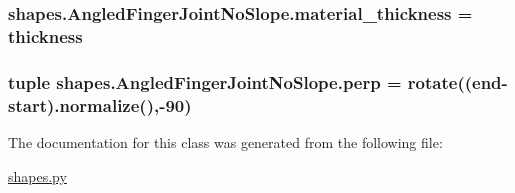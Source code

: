 \subsubsection[{material\+\_\+thickness}]{\setlength{\rightskip}{0pt plus 5cm}shapes.\+Angled\+Finger\+Joint\+No\+Slope.\+material\+\_\+thickness = thickness\hspace{0.3cm}{\ttfamily [static]}}\label{classshapes_1_1_angled_finger_joint_no_slope_a91b614d80a08eecf07213faeea10e29a}
\hypertarget{classshapes_1_1_angled_finger_joint_no_slope_a6bfdc95eb46713361e3e22d07c3b3253}{}
\subsubsection[{perp}]{\setlength{\rightskip}{0pt plus 5cm}tuple shapes.\+Angled\+Finger\+Joint\+No\+Slope.\+perp = rotate((end-\/start).normalize(),-\/90)\hspace{0.3cm}{\ttfamily [static]}}\label{classshapes_1_1_angled_finger_joint_no_slope_a6bfdc95eb46713361e3e22d07c3b3253}


The documentation for this class was generated from the following file\+:\begin{DoxyCompactItemize}
\item 
\hyperlink{shapes_8py}{shapes.\+py}\end{DoxyCompactItemize}
